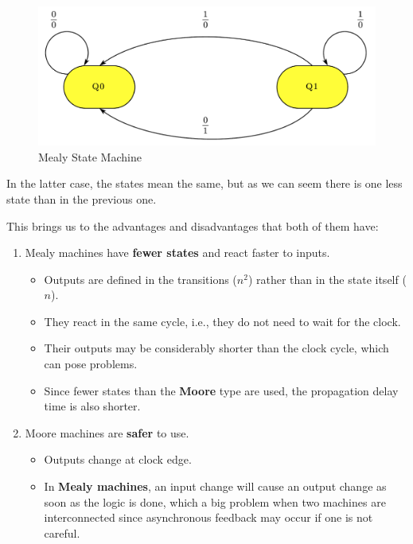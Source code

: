 \vspace{-0.3cm}

\begin{figure}[H]
    \centering
    \includegraphics[scale = 0.45]{Graphics/VHDL/Practice 4/MEALY_FSM.pdf}
    \caption{Mealy State Machine ~\autocite{SLIDES_4}}
    \label{fig:MEALY}
\end{figure}

In the latter case, the states mean the same, but as we can seem there is one less state than in the previous one. \bigskip


This brings us to the advantages and disadvantages that both of them have:

\begin{enumerate}
    \item Mealy machines have \textbf{fewer states} and react faster to inputs.
        \begin{itemize}
            \item Outputs are defined in the transitions ($n^2$) rather than in the state itself ($n$).
            \item They react in the same cycle, i.e., they do not need to wait for the clock.
            \item Their outputs may be considerably shorter than the clock cycle, which can pose problems.
            \item Since fewer states than the \textbf{Moore} type are used, the propagation delay time is also shorter.
        \end{itemize}
    \item Moore machines are \textbf{safer} to use.
        \begin{itemize}
            \item Outputs change at clock edge.
            \item In \textbf{Mealy machines}, an input change will cause an output change as soon as the logic is done, which a big problem when two machines are interconnected since asynchronous feedback may occur if one is not careful.
        \end{itemize}
\end{enumerate}

